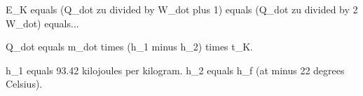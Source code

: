 E_K equals (Q_dot zu divided by W_dot plus 1) equals (Q_dot zu divided by 2 W_dot) equals...  

Q_dot equals m_dot times (h_1 minus h_2) times t_K.  

h_1 equals 93.42 kilojoules per kilogram.  
h_2 equals h_f (at minus 22 degrees Celsius).